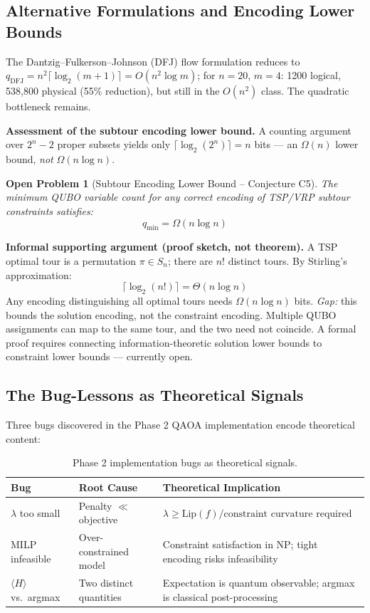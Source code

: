 \documentclass[11pt]{article}
\newtheorem*{openprob}{Open Problem}
\theoremstyle{remark}
\begin{document}
\subsection{Alternative Formulations and Encoding Lower Bounds}

The Dantzig--Fulkerson--Johnson (DFJ) flow formulation reduces to
$q_{\text{DFJ}} = n^2\lceil\log_2(m+1)\rceil = O(n^2 \log m)$;
for $n=20$, $m=4$: 1200 logical, 538,800 physical (55\% reduction), but
still in the $O(n^2)$ class. The quadratic bottleneck remains.

\textbf{Assessment of the subtour encoding lower bound.}
A counting argument over $2^n - 2$ proper subsets yields only
$\lceil\log_2(2^n)\rceil = n$ bits --- an $\Omega(n)$ lower bound,
\emph{not} $\Omega(n\log n)$.

\begin{openprob}[Subtour Encoding Lower Bound -- Conjecture C5]
\label{op:C5}
The minimum QUBO variable count for any correct encoding of TSP/VRP subtour
constraints satisfies:
\begin{equation}
  q_{\min} = \Omega(n \log n)
\end{equation}
\end{openprob}

\noindent\textbf{Informal supporting argument (proof sketch, not theorem).}
A TSP optimal tour is a permutation $\pi \in S_n$; there are $n!$ distinct
tours. By Stirling's approximation:
\begin{equation}
  \lceil\log_2(n!)\rceil = \Theta(n \log n)
\end{equation}
Any encoding distinguishing all optimal tours needs $\Omega(n\log n)$ bits.
\emph{Gap:} this bounds the solution encoding, not the constraint encoding.
Multiple QUBO assignments can map to the same tour, and the two need not
coincide. A formal proof requires connecting information-theoretic solution
lower bounds to constraint lower bounds --- currently open.

\subsection{The Bug-Lessons as Theoretical Signals}

Three bugs discovered in the Phase 2 QAOA implementation encode theoretical
content:

\begin{table}[ht]
\centering
\caption{Phase 2 implementation bugs as theoretical signals.}
\label{tab:bugs}
\begin{tabular}{@{}lll@{}}
\toprule
Bug & Root Cause & Theoretical Implication \\
\midrule
$\lambda$ too small &
  Penalty $\ll$ objective &
  $\lambda \geq \mathrm{Lip}(f)/\text{constraint curvature}$ required \\
MILP infeasible &
  Over-constrained model &
  Constraint satisfaction in NP; tight encoding risks infeasibility \\
$\langle H\rangle$ vs.\ argmax &
  Two distinct quantities &
  Expectation is quantum observable; argmax is classical post-processing \\
\bottomrule
\end{tabular}
\end{table}
\end{document}
